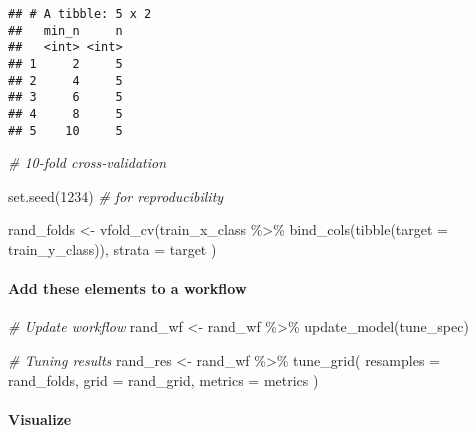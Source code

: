 \documentclass[
]{book}
\newenvironment{Shaded}{\begin{snugshade}}{\end{snugshade}}
\newcommand{\AttributeTok}[1]{\textcolor[rgb]{0.77,0.63,0.00}{#1}}
\newcommand{\CommentTok}[1]{\textcolor[rgb]{0.56,0.35,0.01}{\textit{#1}}}
\newcommand{\DecValTok}[1]{\textcolor[rgb]{0.00,0.00,0.81}{#1}}
\newcommand{\FunctionTok}[1]{\textcolor[rgb]{0.00,0.00,0.00}{#1}}
\newcommand{\NormalTok}[1]{#1}
\newcommand{\OtherTok}[1]{\textcolor[rgb]{0.56,0.35,0.01}{#1}}
\newcommand{\SpecialCharTok}[1]{\textcolor[rgb]{0.00,0.00,0.00}{#1}}
\begin{document}
\begin{verbatim}
## # A tibble: 5 x 2
##   min_n     n
##   <int> <int>
## 1     2     5
## 2     4     5
## 3     6     5
## 4     8     5
## 5    10     5
\end{verbatim}

\begin{Shaded}
\begin{Highlighting}[]
\CommentTok{\# 10{-}fold cross{-}validation}

\FunctionTok{set.seed}\NormalTok{(}\DecValTok{1234}\NormalTok{) }\CommentTok{\# for reproducibility}

\NormalTok{rand\_folds }\OtherTok{\textless{}{-}} \FunctionTok{vfold\_cv}\NormalTok{(train\_x\_class }\SpecialCharTok{\%\textgreater{}\%} \FunctionTok{bind\_cols}\NormalTok{(}\FunctionTok{tibble}\NormalTok{(}\AttributeTok{target =}\NormalTok{ train\_y\_class)),}
  \AttributeTok{strata =}\NormalTok{ target}
\NormalTok{)}
\end{Highlighting}
\end{Shaded}

\hypertarget{add-these-elements-to-a-workflow-2}{%
\paragraph{Add these elements to a workflow}\label{add-these-elements-to-a-workflow-2}}

\begin{Shaded}
\begin{Highlighting}[]
\CommentTok{\# Update workflow}
\NormalTok{rand\_wf }\OtherTok{\textless{}{-}}\NormalTok{ rand\_wf }\SpecialCharTok{\%\textgreater{}\%} \FunctionTok{update\_model}\NormalTok{(tune\_spec)}

\CommentTok{\# Tuning results}
\NormalTok{rand\_res }\OtherTok{\textless{}{-}}\NormalTok{ rand\_wf }\SpecialCharTok{\%\textgreater{}\%}
  \FunctionTok{tune\_grid}\NormalTok{(}
    \AttributeTok{resamples =}\NormalTok{ rand\_folds,}
    \AttributeTok{grid =}\NormalTok{ rand\_grid,}
    \AttributeTok{metrics =}\NormalTok{ metrics}
\NormalTok{  )}
\end{Highlighting}
\end{Shaded}

\hypertarget{visualize-2}{%
\paragraph{Visualize}\label{visualize-2}}
\end{document}
